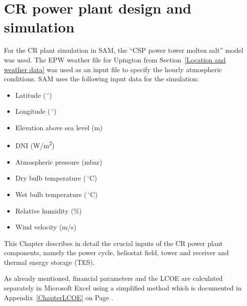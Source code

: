 \section{CR power plant design  and simulation}
For the CR plant simulation in SAM, the \enquote{CSP power tower molten salt} model was used. The EPW weather file for Upington from Section~\ref{Location and weather data} was used as an input file to specify the hourly atmospheric conditions. SAM uses the following input data for the simulation:
\begin{itemize}
\item Latitude ($\,^{\circ}$)
\item Longitude ($\,^{\circ}$)
\item Elevation above sea level (m)
\item DNI (W/m\textsuperscript{2})
\item Atmospheric pressure (mbar)
\item Dry bulb temperature ($\,^{\circ}\mathrm{C}$)
\item Wet bulb temperature ($\,^{\circ}\mathrm{C}$)
\item Relative humidity (\%)
\item Wind velocity (m/s)
\end{itemize}
This Chapter describes in detail the crucial inputs of the CR power plant components, namely the power cycle, heliostat field, tower and receiver and thermal energy storage (TES).

As already mentioned, financial parameters and the LCOE are calculated separately in Microsoft Excel using a simplified method which is documented in Appendix~\ref{ChapterLCOE} on Page \pageref{ChapterLCOE}.

